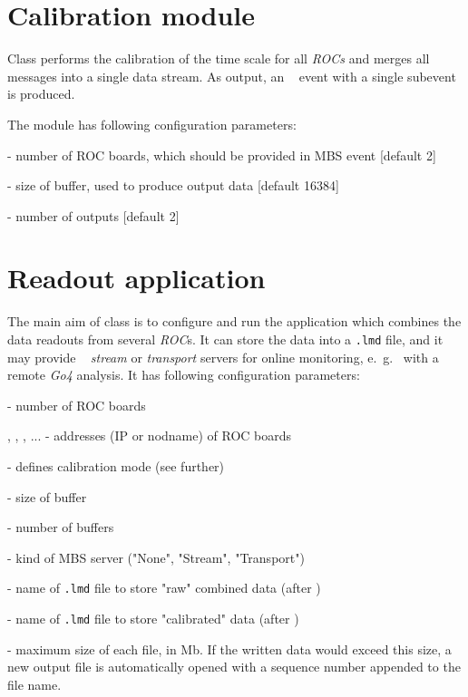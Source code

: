 \section{Calibration module}

Class  performs the calibration of the time scale for all
{\em ROCs} and merges all messages into a single data stream. 
As output, an \mbs~ event with a single
subevent is produced. 

The module has following configuration parameters:
\bbul
\item {}     - number of ROC boards, which should be provided in MBS event [default 2]  
\item {}  - size of buffer, used to produce output data [default 16384]
\item {}  - number of outputs [default 2]
\ebul
 

\section{Readout application}

The main aim of  class is to configure and run 
the application which combines the data readouts from several {\em ROC}s.
It can store the data into a {\tt \*.lmd} file, and it  
may provide  \mbs~ {\em stream} or {\em transport} servers 
for online monitoring, e.~g.~ with a remote {\em Go4} analysis.
It has following configuration parameters:

\bbul
\item {}   - number of ROC boards  
\item {}, , , ... - addresses (IP or nodname) of ROC boards
\item {}  - defines calibration mode (see further)
\item {} - size of buffer
\item {} - number of buffers
\item {} - kind of MBS server ("None", "Stream", "Transport")
\item {} - name of {\tt \*.lmd} file to store "raw" combined data (after
)
\item {} - name of {\tt \*.lmd} file to store "calibrated" data (after
)
\item {} - maximum size of each file, in Mb. If the written data 
would exceed this size, a new output file is automatically opened with a sequence number appended to the file name.
\ebul

